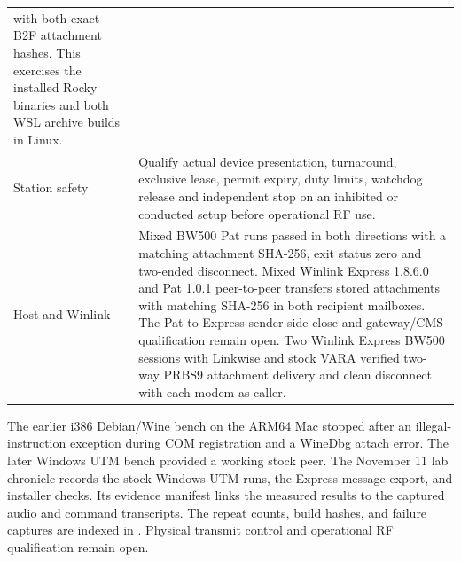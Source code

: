 \begin{longtable}{@{}p{}p{}@{}}
with both exact B2F attachment hashes. This exercises the installed
Rocky binaries and both WSL archive builds in Linux.\\
Station safety & Qualify actual device presentation, turnaround, exclusive
lease, permit expiry, duty limits, watchdog release and independent stop on
an inhibited or conducted setup before operational RF use.\\
Host and Winlink & Mixed BW500 Pat runs passed in both directions with a
matching attachment SHA-256, exit status zero and two-ended disconnect.
Mixed Winlink Express 1.8.6.0 and Pat 1.0.1 peer-to-peer transfers stored
attachments with matching SHA-256 in both recipient mailboxes. The
Pat-to-Express sender-side close and gateway/CMS qualification remain open.
Two Winlink Express BW500 sessions with Linkwise and stock VARA verified
two-way PRBS9 attachment delivery and clean disconnect with each modem
as caller.\\
\bottomrule
\end{longtable}

The earlier i386 Debian/Wine bench on the ARM64 Mac stopped after an
illegal-instruction exception during COM registration and a WineDbg
attach error. The later Windows UTM bench provided a working stock peer.
The November 11 lab chronicle records the stock Windows UTM runs, the
Express message export, and installer checks. Its evidence manifest links
the measured results to the captured audio and command transcripts.
The repeat counts, build hashes, and failure captures are indexed in
.
Physical transmit control and operational RF qualification remain open.
